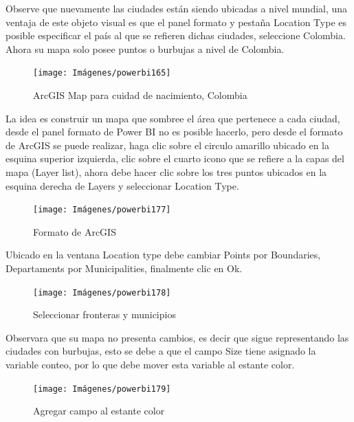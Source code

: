 \documentclass[
]{book}
\begin{document}
Observe que nuevamente las ciudades están siendo ubicadas a nivel mundial, una ventaja de este objeto visual es que el panel formato y pestaña Location Type es posible especificar el país al que se refieren dichas ciudades, seleccione Colombia. Ahora su mapa solo posee puntos o burbujas a nivel de Colombia.

\begin{figure}

{\centering \texttt{[image: Imágenes/powerbi165]} 

}

\caption{ArcGIS Map para cuidad de nacimiento, Colombia}\label{fig:mapaarcgiscolombia-fig}
\end{figure}

La idea es construir un mapa que sombree el área que pertenece a cada ciudad, desde el panel formato de Power BI no es posible hacerlo, pero desde el formato de ArcGIS se puede realizar, haga clic sobre el circulo amarillo ubicado en la esquina superior izquierda, clic sobre el cuarto icono que se refiere a la capas del mapa (Layer list), ahora debe hacer clic sobre los tres puntos ubicados en la esquina derecha de Layers y seleccionar Location Type.

\begin{figure}

{\centering \texttt{[image: Imágenes/powerbi177]} 

}

\caption{Formato de ArcGIS}\label{fig:mapaarcgiscolombiasombrear-fig}
\end{figure}

Ubicado en la ventana Location type debe cambiar Points por Boundaries, Departaments por Municipalities, finalmente clic en Ok.

\begin{figure}

{\centering \texttt{[image: Imágenes/powerbi178]} 

}

\caption{Seleccionar fronteras y municipios}\label{fig:mapaarcgiscolombiasformatomunicipios-fig}
\end{figure}

Observara que su mapa no presenta cambios, es decir que sigue representando las ciudades con burbujas, esto se debe a que el campo Size tiene asignado la variable conteo, por lo que debe mover esta variable al estante color.

\begin{figure}

{\centering \texttt{[image: Imágenes/powerbi179]} 

}

\caption{Agregar campo al estante color}\label{fig:mapaarcgiscoloreado-fig}
\end{figure}
\end{document}
